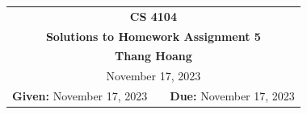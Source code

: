\documentclass[11pt,twoside]{article}
\newcommand{\coursenumber}{CS 4104}
\newcommand{\docdate}{November 08, 2023}
\newcommand{\duedate}{November 17, 2023}
\newcommand{\homeworknumber}{5}
\newcommand{\doctitle}{Solutions to Homework Assignment \homeworknumber}
\newcommand{\doctitle}{Homework Assignment \homeworknumber}
\renewcommand{\docdate}{\duedate}
\renewcommand{\author}{Thang Hoang}
\begin{document}
\thispagestyle{empty}

\begin{center}
\begin{tabular}{lcr}
\multicolumn{3}{c}{\Large\textbf{\coursenumber}}
\\[0.04in]
\multicolumn{3}{c}{\Large\textbf{\doctitle}}
\ifthenelse{\boolean{solutions}}{%
\\[0.04in]\multicolumn{3}{c}{\large\textbf{\author}}
}{} %
\ifthenelse{\boolean{solutions}}{%
\\[0.10in]\multicolumn{3}{c}{\duedate}
}{%
\\[0.10in]
\textbf{Given:} \docdate
& \hspace*{1.0in} &
\textbf{Due:} \duedate
}
\end{tabular}
\end{center}
\end{document}
